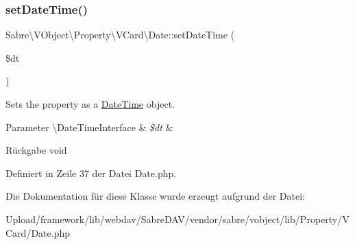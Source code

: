 \subsubsection{\texorpdfstring{set\+Date\+Time()}{setDateTime()}}
{\footnotesize\ttfamily Sabre\textbackslash{}\+V\+Object\textbackslash{}\+Property\textbackslash{}\+V\+Card\textbackslash{}\+Date\+::set\+Date\+Time (\begin{DoxyParamCaption}\item[{\textbackslash{}Date\+Time\+Interface}]{\$dt }\end{DoxyParamCaption})}

Sets the property as a \mbox{\hyperlink{class_sabre_1_1_v_object_1_1_property_1_1_v_card_1_1_date_time}{Date\+Time}} object.


\begin{DoxyParams}[1]{Parameter}
\textbackslash{}\+Date\+Time\+Interface & {\em \$dt} & \\
\hline
\end{DoxyParams}
\begin{DoxyReturn}{Rückgabe}
void 
\end{DoxyReturn}


Definiert in Zeile 37 der Datei Date.\+php.



Die Dokumentation für diese Klasse wurde erzeugt aufgrund der Datei\+:\begin{DoxyCompactItemize}
\item 
Upload/framework/lib/webdav/\+Sabre\+D\+A\+V/vendor/sabre/vobject/lib/\+Property/\+V\+Card/Date.\+php\end{DoxyCompactItemize}
